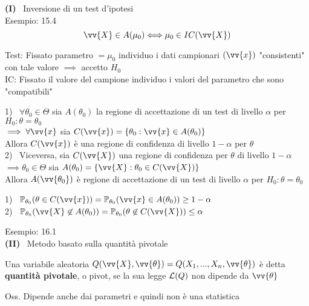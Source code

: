 \textbf{(I)} \ Inversione di un test d'ipotesi\\

Esempio: 15.4\\

\[
\vv{X}\in A(\mu_0) \Longleftrightarrow \mu_0 \in IC (\vv{X})
\]



Test: Fissato parametro $=\mu_0$ individuo i dati campionari $(\vv{x})$ "consistenti" con tale valore $\implies $ accetto $H_0$\\
IC: Fissato il valore del campione individuo i valori del parametro che sono "compatibili"\\



\begin{teo}
1) \ $\forall \theta_0\in\Theta$ sia $A(\theta_0)$ la regione di accettazione di un test di livello $\alpha$ per $H_0 : \theta=\theta_0$\\
$\implies \forall\vv{x}$ sia $C(\vv{x})= \{\theta_0 : \vv{x}\in A(\theta_0)\}$\\
Allora $C(\vv{x})$ è una regione di confidenza di livello $1-\alpha$ per $\theta$\\

2) \ Viceversa, sia $C(\vv{X})$ una regione di confidenza per $\theta$ di livello $1-\alpha$\\
$\implies \theta_0\in \Theta$ sia $A(\theta_0)=\{\vv{X} : \theta_0 \in C(\vv{X}) \}$\\
Allora $A(\vv{\theta_0})$ è regione di accettazione di un test di livello $\alpha$ per $H_0 : \theta=\theta_0$
\end{teo}

\begin{Dim}
1) \ $\PP_{\theta_0}(\theta\in C(\vv{x}))= \PP_{\theta_0}(\vv{x}\in A(\theta_0)) \ge 1-\alpha$\\

2) \ $\PP_{\theta_0}(\vv{X}\not\in A(\theta_0))= \PP_{\theta_0}(\theta\not\in C(\vv{X})) \le \alpha$

\end{Dim}



Esempio: 16.1\\



\textbf{(II)} \ Metodo basato sulla quantità pivotale\\

\begin{defi}[Pivot]
    Una variabile aleatoria $Q(\vv{X}, \vv{\theta}) = Q(X_1,...,X_n,\vv{\theta})$ è detta \textbf{quantità pivotale}, o pivot, se la sua legge $\mathcal L(Q)$ non dipende da $\vv{\theta}$
\end{defi}
Oss. Dipende anche dai parametri e quindi non è una statistica\\

